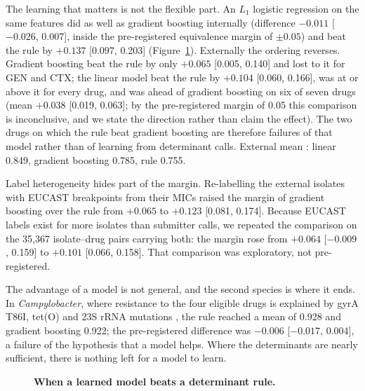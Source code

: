 The learning that matters is not the flexible part. An $L_1$ logistic regression on the same
features did as well as gradient boosting internally (difference $-0.011$ [$-0.026$, 0.007], inside
the pre-registered equivalence margin of $\pm0.05$) and beat the rule by $+0.137$ [0.097, 0.203]
(Figure~\ref{fig:rule}). Externally the ordering reverses. Gradient boosting beat the rule by only
$+0.065$ [0.005, 0.140] and lost to it for GEN and CTX; the linear model beat the rule by $+0.104$
[0.060, 0.166], was at or above it for every drug, and was ahead of gradient boosting on six of
seven drugs (mean $+0.038$ [0.019, 0.063]; by the pre-registered margin of 0.05 this comparison is
inconclusive, and we state the direction rather than claim the effect). The two drugs on which the
rule beat gradient boosting are therefore failures of that model rather than of learning from
determinant calls. External mean \nap{}: linear 0.849, gradient boosting 0.785, rule 0.755.

Label heterogeneity hides part of the margin. Re-labelling the external isolates with EUCAST
breakpoints from their MICs raised the margin of gradient boosting over the rule from $+0.065$ to
$+0.123$ [0.081, 0.174]. Because EUCAST labels exist for more isolates than submitter calls, we
repeated the comparison on the 35,367 isolate--drug pairs carrying both: the margin rose from
$+0.064$ [$-0.009$, 0.159] to $+0.101$ [0.066, 0.158]. That comparison was exploratory, not
pre-registered.

The advantage of a model is not general, and the second species is where it ends. In
\textit{Campylobacter}, where resistance to the four eligible drugs is explained by gyrA T86I,
tet(O) and 23S rRNA mutations \cite{zhao2016campylobacter}, the rule reached a mean \nap{} of 0.928
and gradient boosting 0.922; the pre-registered difference was $-0.006$ [$-0.017$, 0.004], a
failure of the hypothesis that a model helps. Where the determinants are nearly sufficient, there
is nothing left for a model to learn.

\begin{figure}[t]\centering
{}
\caption{\textbf{When a learned model beats a determinant rule.} }\label{fig:rule}
\end{figure}

